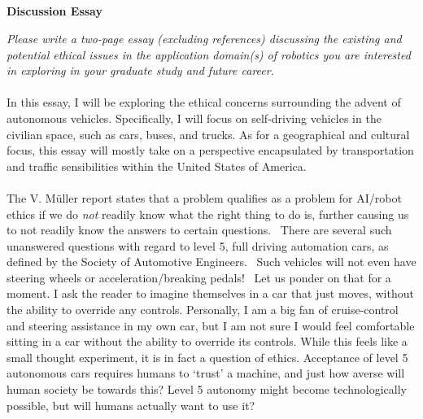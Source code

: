 \documentclass[12pt]{article}
\title{
    \vspace{2in}
    \textmd{\textbf{\hmwkClass\ \hmwkTitle}}\\
    \vspace{3in}
}
\author{\hmwkAuthorName}
\date{}
\newcommand{\supercite}[1]{~{\textsuperscript{\cite{#1}}}}
\begin{document}
\maketitle

\pagebreak

\begin{center}
    \large\textbf{Discussion Essay}
\end{center}

\textit{Please write a two-page essay (excluding references) discussing the existing and potential 
ethical issues in the application domain(s) of robotics you are interested in exploring in your 
graduate study and future career.}\\
\vspace{0in}\\
In this essay, I will be exploring the ethical concerns surrounding the advent of autonomous vehicles.
Specifically, I will focus on self-driving vehicles in the civilian space, such as cars, buses, and trucks.
As for a geographical and cultural focus, this essay will mostly take on a perspective encapsulated by 
transportation and traffic sensibilities within the United States of America.\\
\vspace{0in}\\
The V. Müller report states that a problem qualifies as a problem for AI/robot ethics if
we do \textit{not} readily know what the right thing to do is, further causing us to 
not readily know the answers to certain questions.\supercite{sep-ethics-ai}
There are several such unanswered questions with regard to level 5, 
full driving automation cars, as 
defined by the Society of Automotive Engineers.\supercite{SAE-levels}
Such vehicles will not even have steering wheels or 
acceleration/breaking pedals!\supercite{synopsys-web-article} Let us ponder on that for 
a moment. I ask the reader to imagine themselves in a car that just moves, without the 
ability to override any controls. Personally, I am a big fan of cruise-control and 
steering assistance in my own car, 
but I am not sure I would feel comfortable sitting in a car without 
the ability to override its controls. While this feels like a small 
thought experiment, it is 
in fact a question of ethics. Acceptance of level 5 autonomous cars requires humans 
to `trust' a machine, and just how averse will human society be towards this? Level 5
autonomy might become technologically possible, but will humans actually want to use
it?\\
\vspace{0in}\\
\end{document}

